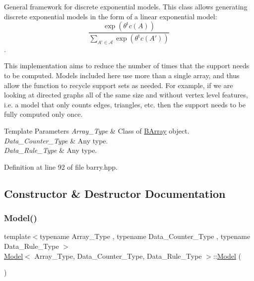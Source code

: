 General framework for discrete exponential models. This class allows generating discrete exponential models in the form of a linear exponential model\+: \[ \frac{ \exp{\left(\theta^{\mbox{t}}c(A)\right)} }{ \sum_{A'\in \mathcal{A}}\exp{\left(\theta^{\mbox{t}}c(A')\right)} } \]. 

This implementation aims to reduce the number of times that the support needs to be computed. Models included here use more than a single array, and thus allow the function to recycle support sets as needed. For example, if we are looking at directed graphs all of the same size and without vertex level features, i.\+e. a model that only counts edges, triangles, etc. then the support needs to be fully computed only once.


\begin{DoxyTemplParams}{Template Parameters}
{\em Array\+\_\+\+Type} & Class of {\ttfamily \hyperlink{classbarry_1_1_b_array}{B\+Array}} object. \\
\hline
{\em Data\+\_\+\+Counter\+\_\+\+Type} & Any type. \\
\hline
{\em Data\+\_\+\+Rule\+\_\+\+Type} & Any type. \\
\hline
\end{DoxyTemplParams}


Definition at line 92 of file barry.\+hpp.



\subsection{Constructor \& Destructor Documentation}
\mbox{\label{classbarry_1_1_model_a29e6e0c37d9a892772c5ee95ce1e1043}} 
\subsubsection{\texorpdfstring{Model()}{Model()}\hspace{0.1cm}{\footnotesize\ttfamily [1/3]}}
{\footnotesize\ttfamily template$<$typename Array\+\_\+\+Type , typename Data\+\_\+\+Counter\+\_\+\+Type , typename Data\+\_\+\+Rule\+\_\+\+Type $>$ \\
\hyperlink{classbarry_1_1_model}{Model}$<$ Array\+\_\+\+Type, Data\+\_\+\+Counter\+\_\+\+Type, Data\+\_\+\+Rule\+\_\+\+Type $>$\+::\hyperlink{classbarry_1_1_model}{Model} (\begin{DoxyParamCaption}{ }\end{DoxyParamCaption})\hspace{0.3cm}{\ttfamily [inline]}}



